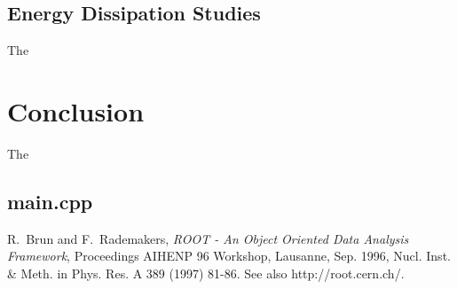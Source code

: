 \documentclass[aps,prl,floatfix,preprint,nofootinbib]{revtex4}
\begin{document}
\subsection{Energy Dissipation Studies}
The

\section{Conclusion}
The

\clearpage
\begin{appendices}
  \singlespacing
  \section{main.cpp} \label{sec:main}

\end{appendices}



\begin{thebibliography}{9}
  R.~Brun and F.~Rademakers, \emph{ROOT - An Object Oriented Data Analysis Framework}, Proceedings AIHENP 96 Workshop, Lausanne, Sep. 1996, Nucl. Inst. \& Meth. in Phys. Res. A 389 (1997) 81-86. See also http://root.cern.ch/.

\end{thebibliography}
\end{document}
